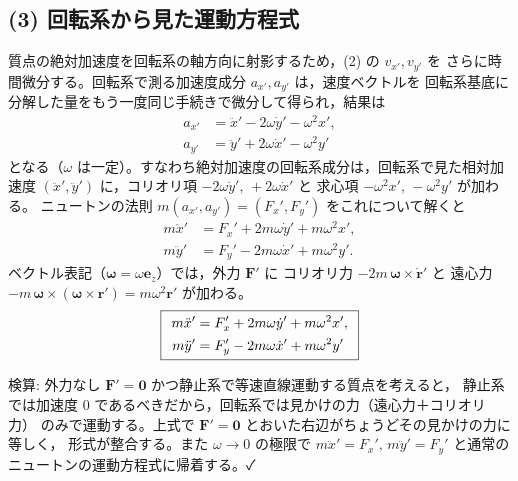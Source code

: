 \documentclass[11pt,a4paper]{article}
\begin{document}
\subsection*{(3) 回転系から見た運動方程式}
質点の絶対加速度を回転系の軸方向に射影するため，(2) の $v_{x'},v_{y'}$ を
さらに時間微分する。回転系で測る加速度成分 $a_{x'},a_{y'}$ は，速度ベクトルを
回転系基底に分解した量をもう一度同じ手続きで微分して得られ，結果は
\begin{align*}
  a_{x'} &= \ddot{x}' - 2\omega\dot{y}' - \omega^2 x',\\
  a_{y'} &= \ddot{y}' + 2\omega\dot{x}' - \omega^2 y'
\end{align*}
となる（$\omega$ は一定）。すなわち絶対加速度の回転系成分は，回転系で見た相対加速度
$(\ddot{x}',\ddot{y}')$ に，コリオリ項 $-2\omega\dot{y}',\,+2\omega\dot{x}'$ と
求心項 $-\omega^2 x',\,-\omega^2 y'$ が加わる。
ニュートンの法則 $m(a_{x'},a_{y'})=(F_x',F_y')$ をこれについて解くと
\begin{align*}
  m\ddot{x}' &= F_x' + 2m\omega\dot{y}' + m\omega^2 x',\\
  m\ddot{y}' &= F_y' - 2m\omega\dot{x}' + m\omega^2 y'.
\end{align*}
ベクトル表記（$\bm{\omega}=\omega\bm{e}_z$）では，外力 $\bm{F}'$ に
コリオリ力 $-2m\,\bm{\omega}\times\dot{\bm{r}}'$ と
遠心力 $-m\,\bm{\omega}\times(\bm{\omega}\times\bm{r}')=m\omega^2\bm{r}'$ が加わる。
\[
  \boxed{\,\;
  \begin{aligned}
    m\ddot{x}' &= F_x' + 2m\omega\dot{y}' + m\omega^2 x',\\
    m\ddot{y}' &= F_y' - 2m\omega\dot{x}' + m\omega^2 y'
  \end{aligned}\;\,}
\]

\medskip
検算: 外力なし $\bm{F}'=\bm{0}$ かつ静止系で等速直線運動する質点を考えると，
静止系では加速度 $0$ であるべきだから，回転系では見かけの力（遠心力＋コリオリ力）
のみで運動する。上式で $\bm{F}'=\bm0$ とおいた右辺がちょうどその見かけの力に等しく，
形式が整合する。また $\omega\to0$ の極限で
$m\ddot{x}'=F_x',\,m\ddot{y}'=F_y'$ と通常のニュートンの運動方程式に帰着する。✓
\end{document}
